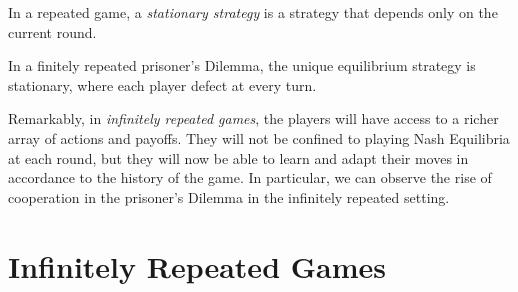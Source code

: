 \begin{definition}
In a repeated game, a \emph{stationary strategy} is a strategy that depends only on the current round.
\end{definition}

\begin{proposition}
In a finitely repeated prisoner's Dilemma, the unique equilibrium strategy is stationary, where each player defect at every turn.
\end{proposition}

Remarkably, in \emph{infinitely repeated games}, the players will have access to a richer array of actions and payoffs. They will not be confined to playing Nash Equilibria at each round, but they will now be able to learn and adapt their moves in accordance to the history of the game. In particular, we can observe the rise of cooperation in the prisoner's Dilemma in the infinitely repeated setting.


\section{Infinitely Repeated Games}
\label{sec:InfRep}

